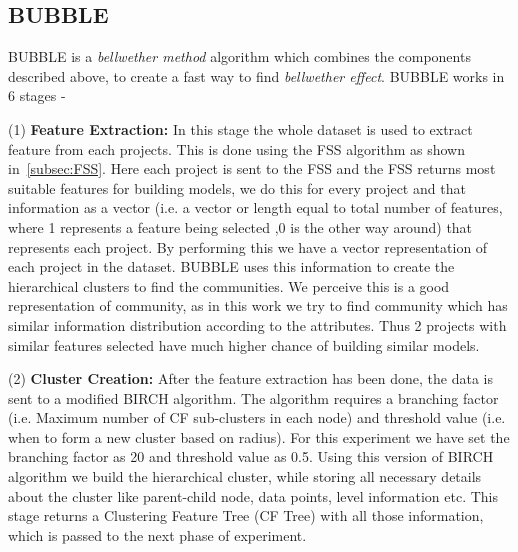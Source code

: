 \documentclass[sigconf]{acmart}
\theoremstyle{break}
\begin{document}
\subsection{BUBBLE}
\label{BUBBLE}

BUBBLE is a \textit{bellwether method} algorithm which combines the components described above, to create a fast way to find \textit{bellwether effect}. BUBBLE works in 6 stages - 

    (1) \textbf{Feature Extraction:} In this stage the whole dataset is used to extract feature from each projects. This is done using the FSS algorithm as shown in~\ref{subsec:FSS}. Here each project is sent to the FSS and the FSS returns most suitable features for building models, we do this for every project and that information as a vector (i.e. a vector or length equal to total number of features, where 1 represents a feature being selected ,0 is the other way around) that represents each project. By performing this we have a vector representation of each project in the dataset. BUBBLE uses this information to create the hierarchical clusters to find the communities. We perceive this is a good representation of community, as in this work we try to find community which has similar information distribution according to the attributes. Thus 2 projects with similar features selected have much higher chance of building similar models.
    
    (2) \textbf{Cluster Creation:} After the feature extraction has been done, the data is sent to a modified BIRCH algorithm. The algorithm requires a branching factor (i.e. Maximum number of CF sub-clusters in each node) and threshold value (i.e. when to form a new cluster based on radius). For this experiment we have set the branching factor as 20 and threshold value as 0.5. Using this version of BIRCH algorithm we build the hierarchical cluster, while storing all necessary details about the cluster like parent-child node, data points, level information etc. This stage returns a Clustering Feature Tree (CF Tree) with all those information, which is passed to the next phase of experiment. 
    
\end{document}
